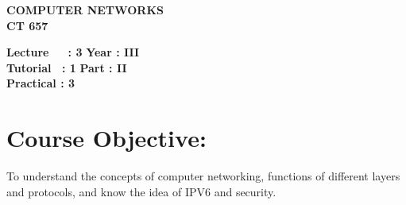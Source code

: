\begin{center}
    \textbf{\huge{\uppercase{Computer Networks}}}
    \\
    \vspace{.5cm}
    \textbf{\large{CT 657}}
\end{center}

\noindent\textbf{Lecture\ \ \ : 3} \hfill \textbf{Year : III} \\
\textbf{Tutorial \ : 1} \hfill \textbf{Part : II } \\
\textbf{Practical : 3}  \\

\par
\noindent 
\section*{Course Objective:}
To understand the concepts of computer networking, functions of different layers and protocols, and know the idea of IPV6 and security.


